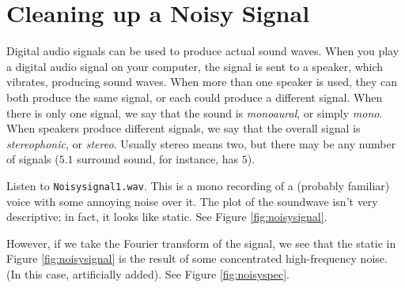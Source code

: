 

\section*{Cleaning up a Noisy Signal} %

Digital audio signals can be used to produce actual sound waves.  When you play a digital audio signal on your computer, the signal is sent to
a speaker, which vibrates, producing sound waves.  When more than one speaker is used, they can both produce the same signal, or each could produce
a different signal.  When there is only one signal, we say that the sound is \emph{monoaural}, or simply \emph{mono}.  When speakers produce different
signals, we say that the overall signal is \emph{stereophonic}, or \emph{stereo}.  Usually stereo means two, but there may be any number of signals ($5.1$
surround sound, for instance, has $5$).

Listen to \texttt{Noisysignal1.wav}.
This is a mono recording of a (probably familiar) voice with some annoying noise over it.
The plot of the soundwave isn't very descriptive; in fact, it looks like static.
See Figure \ref{fig:noisysignal}.

However, if we take the Fourier transform of the signal, we see that the static in Figure \ref{fig:noisysignal} is the result of some concentrated high-frequency noise.
(In this case, artificially added).
See Figure \ref{fig:noisyspec}.

